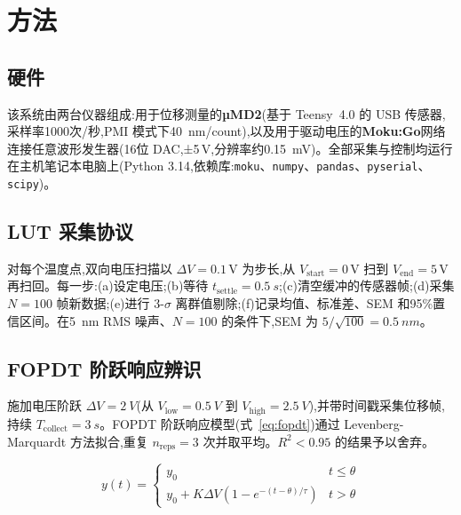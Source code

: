 \documentclass[fleqn,10pt]{wlscirep}
\begin{document}
\section*{方法}

\subsection*{硬件}

该系统由两台仪器组成:用于位移测量的\textbf{µMD2}(基于 Teensy~4.0 的 USB 传感器,采样率1000次/秒,PMI 模式下\SI{40}{nm/count}),以及用于驱动电压的\textbf{Moku:Go}网络连接任意波形发生器(16位 DAC,±5\,V,分辨率约\SI{0.15}{mV})。全部采集与控制均运行在主机笔记本电脑上(Python 3.14,依赖库:\texttt{moku}、\texttt{numpy}、\texttt{pandas}、\texttt{pyserial}、\texttt{scipy})。

\subsection*{LUT 采集协议}

对每个温度点,双向电压扫描以 $\Delta V = 0.1$\,V 为步长,从 $V_\text{start} = 0$\,V 扫到 $V_\text{end} = 5$\,V 再扫回。每一步:(a)设定电压;(b)等待 $t_\text{settle} = \SI{0.5}{s}$;(c)清空缓冲的传感器帧;(d)采集 $N = 100$ 帧新数据;(e)进行 3-$\sigma$ 离群值剔除;(f)记录均值、标准差、SEM 和95\%置信区间。在\SI{5}{nm} RMS 噪声、$N = 100$ 的条件下,SEM 为 $5/\sqrt{100} = \SI{0.5}{nm}$。

\subsection*{FOPDT 阶跃响应辨识}

施加电压阶跃 $\Delta V = \SI{2}{V}$(从 $V_\text{low} = \SI{0.5}{V}$ 到 $V_\text{high} = \SI{2.5}{V}$),并带时间戳采集位移帧,持续 $T_\text{collect} = \SI{3}{s}$。FOPDT 阶跃响应模型(式~\ref{eq:fopdt})通过 Levenberg-Marquardt 方法拟合,重复 $n_\text{reps} = 3$ 次并取平均。$R^2 < 0.95$ 的结果予以舍弃。

\begin{equation}
y(t) = \begin{cases} y_0 & t \leq \theta \\ y_0 + K \Delta V \left(1 - e^{-(t-\theta)/\tau}\right) & t > \theta \end{cases}
\label{eq:fopdt}
\end{equation}
\end{document}
